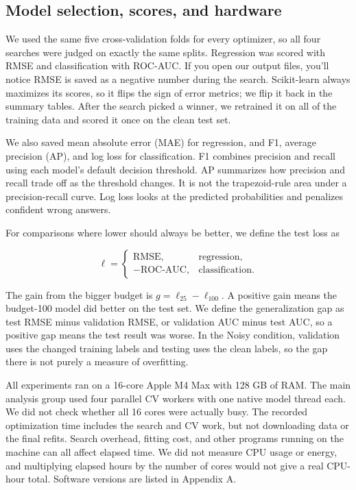 \documentclass[12pt,letterpaper]{article}
\begin{document}
\subsection{Model selection, scores, and hardware}\label{model-selection-scores-and-hardware}

We used the same five cross-validation folds for every optimizer, so all four searches were judged on exactly the same splits. Regression was scored with RMSE and classification with ROC-AUC. If you open our output files, you'll notice RMSE is saved as a negative number during the search. Scikit-learn always maximizes its scores, so it flips the sign of error metrics; we flip it back in the summary tables. After the search picked a winner, we retrained it on all of the training data and scored it once on the clean test set.

We also saved mean absolute error (MAE) for regression, and F1, average precision (AP), and log loss for classification. F1 combines precision and recall using each model's default decision threshold. AP summarizes how precision and recall trade off as the threshold changes. It is not the trapezoid-rule area under a precision-recall curve. Log loss looks at the predicted probabilities and penalizes confident wrong answers.

For comparisons where lower should always be better, we define the test loss as

\[\ell = \begin{cases} \text{RMSE}, & \text{regression},\\ -\text{ROC-AUC}, & \text{classification}. \end{cases}\]

The gain from the bigger budget is \(g = \ell_{25} - \ell_{100}\). A positive gain means the budget-100 model did better on the test set. We define the generalization gap as test RMSE minus validation RMSE, or validation AUC minus test AUC, so a positive gap means the test result was worse. In the Noisy condition, validation uses the changed training labels and testing uses the clean labels, so the gap there is not purely a measure of overfitting.

All experiments ran on a 16-core Apple M4 Max with 128 GB of RAM. The main analysis group used four parallel CV workers with one native model thread each. We did not check whether all 16 cores were actually busy. The recorded optimization time includes the search and CV work, but not downloading data or the final refits. Search overhead, fitting cost, and other programs running on the machine can all affect elapsed time. We did not measure CPU usage or energy, and multiplying elapsed hours by the number of cores would not give a real CPU-hour total. Software versions are listed in Appendix A.
\end{document}
